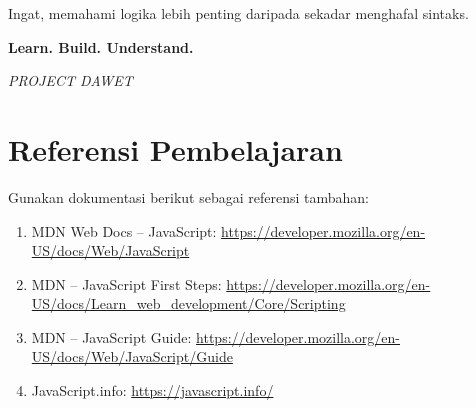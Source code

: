\documentclass[12pt,a4paper]{article}
\begin{document}
Ingat, memahami logika lebih penting daripada
sekadar menghafal sintaks.

\begin{center}
    \vspace{0.5cm}
    \textbf{\Large Learn. Build. Understand.}

    \vspace{0.2cm}
    \textit{PROJECT DAWET}
\end{center}

\section*{Referensi Pembelajaran}

Gunakan dokumentasi berikut sebagai referensi
tambahan:

\begin{enumerate}
    \item MDN Web Docs -- JavaScript:
    \url{https://developer.mozilla.org/en-US/docs/Web/JavaScript}

    \item MDN -- JavaScript First Steps:
    \url{https://developer.mozilla.org/en-US/docs/Learn_web_development/Core/Scripting}

    \item MDN -- JavaScript Guide:
    \url{https://developer.mozilla.org/en-US/docs/Web/JavaScript/Guide}

    \item JavaScript.info:
    \url{https://javascript.info/}
\end{enumerate}
\end{document}
